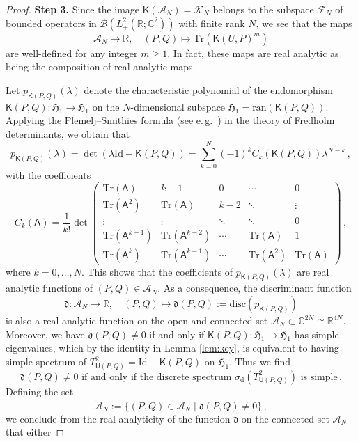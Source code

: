\documentclass[11pt,reqno]{amsart}
\theoremstyle{definition}
\theoremstyle{remark}
\theoremstyle{remark}
\numberwithin{equation}{section}
\newcommand{\Hfr}{\mathfrak{H}}
\newcommand{\C}{\mathbb{C}}
\newcommand{\R}{\mathbb{R}}
\newcommand{\ran}{\mathrm{ran}}
\newcommand{\id}{\mathrm{Id}}
\newcommand{\Tr}{\mathrm{Tr}}
\begin{document}
\begin{proof}
\medskip
\textbf{Step 3.} Since the image $\mathsf{K}(\mathcal{A}_N) = \mathcal{K}_N$ belongs to the subspace $\mathcal{F}_N$ of bounded operators in $\mathcal{B}(L^2_+(\R; \C^2))$ with finite rank $N$, we see that the maps 
$$
\mathcal{A}_N \to \R, \quad (P,Q) \mapsto \Tr(\mathsf{K}(U,P)^m) 
$$ 
are well-defined for any integer $m \geq 1$. In fact, these maps are real analytic as being  the composition of real analytic maps. 

Let $p_{\mathsf{K}(P,Q)}(\lambda)$ denote the characteristic polynomial of the endomorphism $\mathsf{K}(P,Q) : \Hfr_1 \to \Hfr_1$ on the $N$-dimensional subspace $\Hfr_1 = \ran (\mathsf{K}(P,Q))$. Applying the Plemelj--Smithies formula (see e.\,g.~\cite{GoGoKr-00}) in the theory of Fredholm determinants, we obtain that
$$
p_{\mathsf{K}(P,Q)}(\lambda) = \det(\lambda \id - \mathsf{K}(P,Q)) = \sum_{k=0}^N (-1)^k C_k(\mathsf{K}(P,Q)) \lambda^{N-k} \, ,
$$ 
with the coefficients
$$
C_k(\mathsf{A}) = \frac{1}{k!} \det \left ( \begin{array}{lllll} \Tr (\mathsf{A}) & k-1 & 0 & \cdots & 0 \\ \Tr (\mathsf{A}^2) & \Tr (\mathsf{A} ) & k-2 & \ddots  & \vdots \\ \vdots & \vdots & \ddots & \ddots & 0 \\
\Tr ( \mathsf{A}^{k-1}) & \Tr ( \mathsf{A}^{k-2}) & \cdots & \Tr(\mathsf{A}) & 1 \\ \Tr(\mathsf{A}^k) & \Tr(\mathsf{A}^{k-1}) & \cdots & \Tr(\mathsf{A}^2) & \Tr(\mathsf{A}) \end{array} \right ) \, ,
$$
where $k=0, \ldots, N$. This shows that the coefficients of $p_{\mathsf{K}(P,Q)}(\lambda)$ are real analytic functions of $(P,Q) \in \mathcal{A}_N$. As a consequence, the discriminant function
$$
\mathfrak{d} : \mathcal{A}_N \to \R, \quad (P,Q) \mapsto \mathfrak{d}(P,Q) := \mathrm{disc}(p_{\mathsf{K}(P,Q)}) 
$$
is also a real analytic function on the open and connected set $\mathcal{A}_N \subset \C^{2N} \cong \R^{4N}$. Moreover, we have $\mathfrak{d}(P,Q) \neq 0$ if and only if $\mathsf{K}(P,Q) : \Hfr_1 \to \Hfr_1$ has simple eigenvalues, which by the identity in Lemma \ref{lem:key}, is equivalent to having simple spectrum of $T_{\mathsf{U}(P,Q)}^2=\id - \mathsf{K}(P,Q)$ on $\Hfr_1$. Thus we find
$$
\mbox{$\mathfrak{d}(P,Q) \neq 0$ if and only if the discrete spectrum $\sigma_{\mathrm{d}}(T_{\mathsf{U}(P,Q)}^2)$ is simple} \, .
$$
Defining the set
$$
\widetilde{\mathcal{A}}_N := \{ (P,Q) \in \mathcal{A}_N \mid \mathfrak{d}(P,Q) \neq 0 \} \, ,
$$
we conclude from the real analyticity of the function $\mathfrak{d}$ on the connected set $\mathcal{A}_N$ that either

\end{proof}
\end{document}
